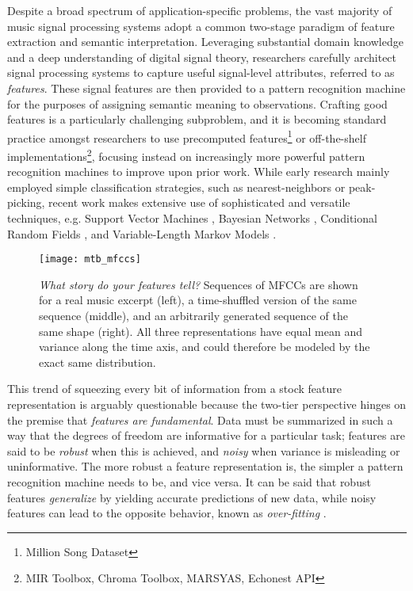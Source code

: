 Despite a broad spectrum of application-specific problems, the vast majority of music signal processing systems adopt a common two-stage paradigm of feature extraction and semantic interpretation.
Leveraging substantial domain knowledge and a deep understanding of digital signal theory, researchers carefully architect signal processing systems to capture useful signal-level attributes, referred to as \emph{features}.
These signal features are then provided to a pattern recognition machine for the purposes of assigning semantic meaning to observations.
Crafting good features is a particularly challenging subproblem, and it is becoming standard practice amongst researchers to use precomputed features\footnote{Million Song Dataset} or off-the-shelf implementations\footnote{MIR Toolbox, Chroma Toolbox, MARSYAS, Echonest API}, focusing instead on increasingly more powerful pattern recognition machines to improve upon prior work.
While early research mainly employed simple classification strategies, such as nearest-neighbors or peak-picking, recent work makes extensive use of sophisticated and versatile techniques, e.g. Support Vector Machines \cite{Mandel2005}, Bayesian Networks \cite{Mauch2010a}, Conditional Random Fields \cite{Sumi2012}, and Variable-Length Markov Models \cite{Chordia2011}.

\begin{figure}
\begin{centering}
\texttt{[image: mtb\_mfccs]}
\caption{\emph{What story do your features tell?} Sequences of MFCCs are shown for a real music excerpt (left), a time-shuffled version of the same sequence (middle), and an arbitrarily generated sequence of the same shape (right). All three representations have equal mean and variance along the time axis, and could therefore be modeled by the exact same distribution.}
\label{fig:mfccs}
\end{centering}
\end{figure}

This trend of squeezing every bit of information from a stock feature representation is arguably questionable because the two-tier perspective hinges on the premise that \emph{features are fundamental}.
Data must be summarized in such a way that the degrees of freedom are informative for a particular task; features are said to be \emph{robust} when this is achieved, and \emph{noisy} when variance is misleading or uninformative.
The more robust a feature representation is, the simpler a pattern recognition machine needs to be, and vice versa.
It can be said that robust features \emph{generalize} by yielding accurate predictions of new data, while noisy features can lead to the opposite behavior, known as \emph{over-fitting} \cite{Bishop2006}.

